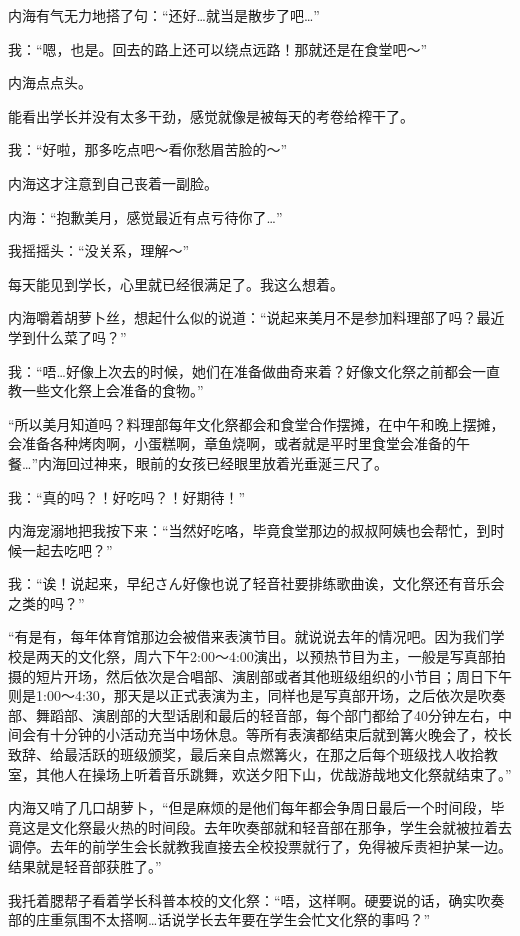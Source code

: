内海有气无力地搭了句：“还好…就当是散步了吧…”

我：“嗯，也是。回去的路上还可以绕点远路！那就还是在食堂吧～”

内海点点头。

能看出学长并没有太多干劲，感觉就像是被每天的考卷给榨干了。

我：“好啦，那多吃点吧～看你愁眉苦脸的～”

内海这才注意到自己丧着一副脸。

内海：“抱歉美月，感觉最近有点亏待你了…”

我摇摇头：“没关系，理解～”

每天能见到学长，心里就已经很满足了。我这么想着。

内海嚼着胡萝卜丝，想起什么似的说道：“说起来美月不是参加料理部了吗？最近学到什么菜了吗？”

我：“唔…好像上次去的时候，她们在准备做曲奇来着？好像文化祭之前都会一直教一些文化祭上会准备的食物。”

“所以美月知道吗？料理部每年文化祭都会和食堂合作摆摊，在中午和晚上摆摊，会准备各种烤肉啊，小蛋糕啊，章鱼烧啊，或者就是平时里食堂会准备的午餐…”内海回过神来，眼前的女孩已经眼里放着光垂涎三尺了。

我：“真的吗？！好吃吗？！好期待！”

内海宠溺地把我按下来：“当然好吃咯，毕竟食堂那边的叔叔阿姨也会帮忙，到时候一起去吃吧？”

我：“诶！说起来，早纪さん好像也说了轻音社要排练歌曲诶，文化祭还有音乐会之类的吗？”

“有是有，每年体育馆那边会被借来表演节目。就说说去年的情况吧。因为我们学校是两天的文化祭，周六下午2:00～4:00演出，以预热节目为主，一般是写真部拍摄的短片开场，然后依次是合唱部、演剧部或者其他班级组织的小节目；周日下午则是1:00～4:30，那天是以正式表演为主，同样也是写真部开场，之后依次是吹奏部、舞蹈部、演剧部的大型话剧和最后的轻音部，每个部门都给了40分钟左右，中间会有十分钟的小活动充当中场休息。等所有表演都结束后就到篝火晚会了，校长致辞、给最活跃的班级颁奖，最后亲自点燃篝火，在那之后每个班级找人收拾教室，其他人在操场上听着音乐跳舞，欢送夕阳下山，优哉游哉地文化祭就结束了。”

内海又啃了几口胡萝卜，“但是麻烦的是他们每年都会争周日最后一个时间段，毕竟这是文化祭最火热的时间段。去年吹奏部就和轻音部在那争，学生会就被拉着去调停。去年的前学生会长就教我直接去全校投票就行了，免得被斥责袒护某一边。结果就是轻音部获胜了。”

我托着腮帮子看着学长科普本校的文化祭：“唔，这样啊。硬要说的话，确实吹奏部的庄重氛围不太搭啊…话说学长去年要在学生会忙文化祭的事吗？”

